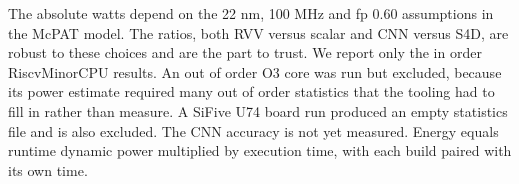 \documentclass[11pt]{article}
\begin{document}
{\small
The absolute watts depend on the 22 nm, 100 MHz and fp 0.60 assumptions in the McPAT model. The ratios, both RVV versus scalar and CNN versus S4D, are robust to these choices and are the part to trust. We report only the in order RiscvMinorCPU results. An out of order O3 core was run but excluded, because its power estimate required many out of order statistics that the tooling had to fill in rather than measure. A SiFive U74 board run produced an empty statistics file and is also excluded. The CNN accuracy is not yet measured. Energy equals runtime dynamic power multiplied by execution time, with each build paired with its own time.
}
\end{document}
